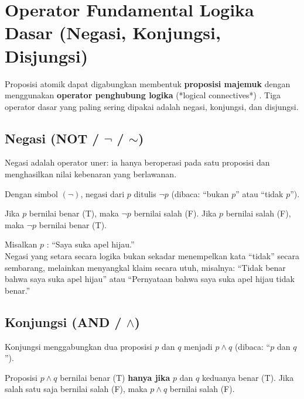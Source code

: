 \section{Operator Fundamental Logika Dasar (Negasi, Konjungsi, Disjungsi)}

Proposisi atomik dapat digabungkan membentuk \textbf{proposisi majemuk} dengan menggunakan \textbf{operator penghubung logika} (*logical connectives*) \cite{rosen2019}. Tiga operator dasar yang paling sering dipakai adalah negasi, konjungsi, dan disjungsi.

\subsection{Negasi (NOT / $\neg$ / $\sim$)}

Negasi adalah operator uner: ia hanya beroperasi pada satu proposisi dan menghasilkan nilai kebenaran yang berlawanan.

Dengan simbol $(\neg)$, negasi dari $p$ ditulis $\neg p$ (dibaca: ``bukan $p$'' atau ``tidak $p$'').

\begin{definisi}
Jika $p$ bernilai benar (T), maka $\neg p$ bernilai salah (F). Jika $p$ bernilai salah (F), maka $\neg p$ bernilai benar (T).
\end{definisi}

\begin{contoh}
Misalkan $p$ : ``Saya suka apel hijau.''\\
Negasi yang setara secara logika bukan sekadar menempelkan kata ``tidak'' secara sembarang, melainkan menyangkal klaim secara utuh, misalnya: ``Tidak benar bahwa saya suka apel hijau'' atau ``Pernyataan bahwa saya suka apel hijau tidak benar.''
\end{contoh}

\subsection{Konjungsi (AND / $\wedge$)}

Konjungsi menggabungkan dua proposisi $p$ dan $q$ menjadi $p \wedge q$ (dibaca: ``$p$ dan $q$'').

\begin{definisi}
Proposisi $p \wedge q$ bernilai benar (T) \textbf{hanya jika} $p$ dan $q$ keduanya benar (T). Jika salah satu saja bernilai salah (F), maka $p \wedge q$ bernilai salah (F).
\end{definisi}

